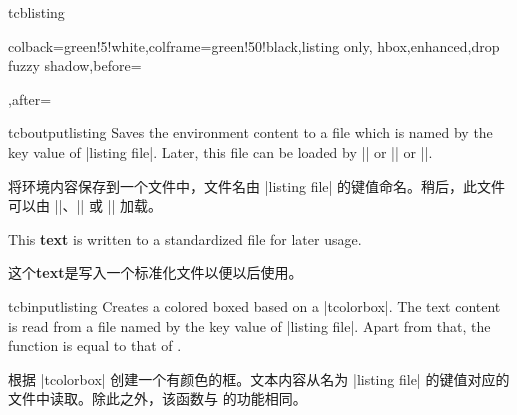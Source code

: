 \begin{docEnvironment}{tcblisting}{}
\begin{dispExample}
\begin{tcblisting}{colback=green!5!white,colframe=green!50!black,listing only,
hbox,enhanced,drop fuzzy shadow,before=\begin{center},after=\end{center}}
\end{tcblisting}
\end{dispExample}
\end{docEnvironment}


\begin{docEnvironment}{tcboutputlisting}{}
Saves the environment content to a file which is named by the key value of
|listing file|. Later, this file can be loaded by
|\tcbinputlisting| or |\tcbuselistingtext| or |\tcbuselistinglisting|.

将环境内容保存到一个文件中，文件名由 |listing file| 的键值命名。稍后，此文件可以由 |\tcbinputlisting|、|\tcbuselistingtext| 或 |\tcbuselistinglisting| 加载。
\begin{dispListing}
\begin{tcboutputlisting}
This \textbf{text} is written to a standardized file for later usage.

这个\textbf{text}是写入一个标准化文件以便以后使用。
\end{tcboutputlisting}
\end{dispListing}
\end{docEnvironment}


\begin{docCommand}{tcbinputlisting}{}
Creates a colored boxed based on a |tcolorbox|. The text content is read
from a file named by the key value of |listing file|. Apart from that,
the function is equal to that of .

根据 |tcolorbox| 创建一个有颜色的框。文本内容从名为 |listing file| 的键值对应的文件中读取。除此之外，该函数与  的功能相同。
\begin{dispExample}
\end{dispExample}
\end{docCommand}

